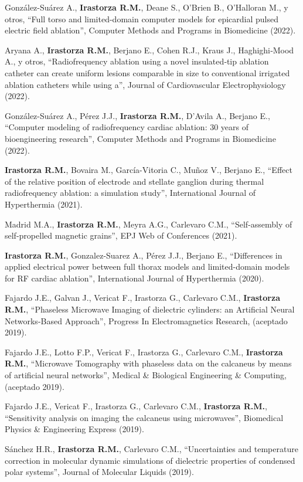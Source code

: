 \documentclass[margin,line]{res}
\begin{document}
\begin{resume}
González-Suárez A., \textbf{Irastorza R.M.}, Deane S., O'Brien B., O'Halloran M., y otros, ``Full torso and limited-domain computer models for epicardial pulsed electric field ablation'', Computer Methods and Programs in Biomedicine (2022).

Aryana A., \textbf{Irastorza R.M.}, Berjano E., Cohen R.J., Kraus J., Haghighi‐Mood A., y otros, ``Radiofrequency ablation using a novel insulated‐tip ablation catheter can create uniform lesions comparable in size to conventional irrigated ablation catheters while using a'', Journal of Cardiovascular Electrophysiology (2022).

González-Suárez A., Pérez J.J., \textbf{Irastorza R.M.}, D'Avila A., Berjano E., ``Computer modeling of radiofrequency cardiac ablation: 30 years of bioengineering research'', Computer Methods and Programs in Biomedicine (2022).

\textbf{Irastorza R.M.}, Bovaira M., García-Vitoria C., Muñoz V., Berjano E., ``Effect of the relative position of electrode and stellate ganglion during thermal radiofrequency ablation: a simulation study'', International Journal of Hyperthermia (2021).

Madrid M.A., \textbf{Irastorza R.M.}, Meyra A.G., Carlevaro C.M., ``Self-assembly of self-propelled magnetic grains'', EPJ Web of Conferences (2021).

\textbf{Irastorza R.M.}, Gonzalez-Suarez A., Pérez J.J., Berjano E., ``Differences in applied electrical power between full thorax models and limited-domain models for RF cardiac ablation'', International Journal of Hyperthermia (2020).

Fajardo J.E., Galvan J., Vericat F., Irastorza G., Carlevaro C.M., \textbf{Irastorza R.M.}, ``Phaseless Microwave Imaging of dielectric cylinders: an Artificial Neural Networks-Based Approach'', Progress In Electromagnetics Research, (aceptado 2019). 

Fajardo J.E., Lotto F.P., Vericat F., Irastorza G., Carlevaro C.M., \textbf{Irastorza R.M.}, ``Microwave Tomography with phaseless data on the calcaneus by means of artificial neural networks'', Medical \& Biological Engineering \& Computing, (aceptado 2019).

Fajardo J.E., Vericat F., Irastorza G., Carlevaro C.M., \textbf{Irastorza R.M.}, ``Sensitivity analysis on imaging the calcaneus using microwaves'', Biomedical Physics \& Engineering Express (2019).

Sánchez H.R., {\bf Irastorza R.M.}, Carlevaro C.M., ``Uncertainties and temperature correction in molecular dynamic simulations of dielectric properties of condensed polar systems'', Journal of Molecular Liquids (2019).


\end{resume}
\end{document}
